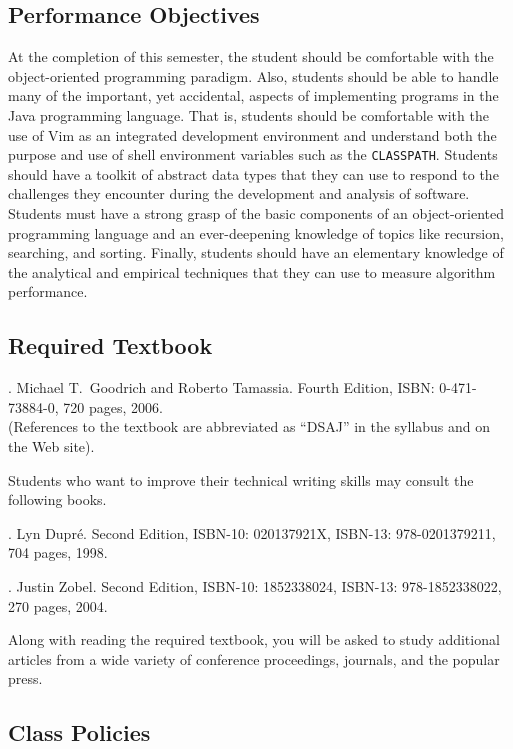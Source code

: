 \subsection*{Performance Objectives}

At the completion of this semester, the student should be comfortable with the object-oriented programming paradigm.
Also, students should be able to handle many of the important, yet accidental, aspects of implementing programs in the
Java programming language.  That is, students should be comfortable with the use of Vim as an integrated development
environment and understand both the purpose and use of shell environment variables such as the {\tt CLASSPATH}.
Students should have a toolkit of abstract data types that they can use to respond to the challenges they encounter
during the development and analysis of software.  Students must have a strong grasp of the basic components of an
object-oriented programming language and an ever-deepening knowledge of topics like recursion, searching, and sorting.
Finally, students should have an elementary knowledge of the analytical and empirical techniques that they can use to
measure algorithm performance.

\subsection*{Required Textbook}

. Michael T.\ Goodrich and Roberto Tamassia.
Fourth Edition, ISBN: 0-471-73884-0, 720 pages, 2006. \\
(References to the textbook are abbreviated as ``DSAJ'' in the syllabus and on the Web site).

\noindent
Students who want to improve their technical writing skills may consult the following books.

. Lyn Dupr\'e. Second Edition,  ISBN-10: 020137921X,
ISBN-13: 978-0201379211, 704 pages, 1998.

.  Justin Zobel. Second Edition,  ISBN-10: 1852338024, ISBN-13:
978-1852338022, 270 pages, 2004.

\noindent
Along with reading the required textbook, you will be asked to study additional articles from a wide variety of
conference proceedings, journals, and the popular press.

\subsection*{Class Policies}

